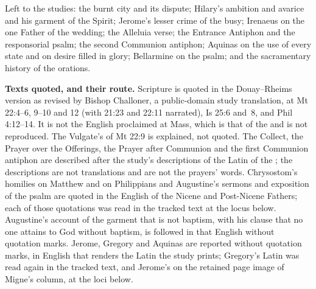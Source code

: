 {Left to the studies: the burnt city and its dispute; Hilary's ambition and
avarice and his garment of the Spirit; Jerome's lesser crime of the busy;
Irenaeus on the one Father of the wedding; the Alleluia verse; the Entrance
Antiphon and the responsorial psalm; the second Communion antiphon; Aquinas
on the use of every state and on desire filled in glory; Bellarmine on the
psalm; and the sacramentary history of the orations.

\textbf{Texts quoted, and their route.} Scripture is quoted in the
Douay--Rheims version as revised by Bishop Challoner, a public-domain study
translation, at Mt 22:4--6, 9--10 and 12 (with 21:23 and 22:11 narrated), Is
25:6 and~8, and Phil 4:12--14. It is not the English proclaimed at Mass, which
is that of the  and is not reproduced. The Vulgate's  of Mt 22:9 is explained, not quoted. The Collect, the Prayer over the
Offerings, the Prayer after Communion and the first Communion antiphon are
described after the study's descriptions of the Latin of the ; the descriptions are not translations and are not the prayers'
words. Chrysostom's homilies on Matthew and on Philippians and Augustine's
sermons and exposition of the psalm are quoted in the English of the Nicene and
Post-Nicene Fathers; each of those quotations was read in the tracked text at
the locus below. Augustine's account of the garment that is not baptism, with his
clause that no one attains to God without baptism, is followed in that English
without quotation marks. Jerome, Gregory and Aquinas are reported without
quotation marks, in English that renders the Latin the study prints; Gregory's
Latin was read again in the tracked text, and Jerome's on the retained page
image of Migne's column, at the loci below.

}
